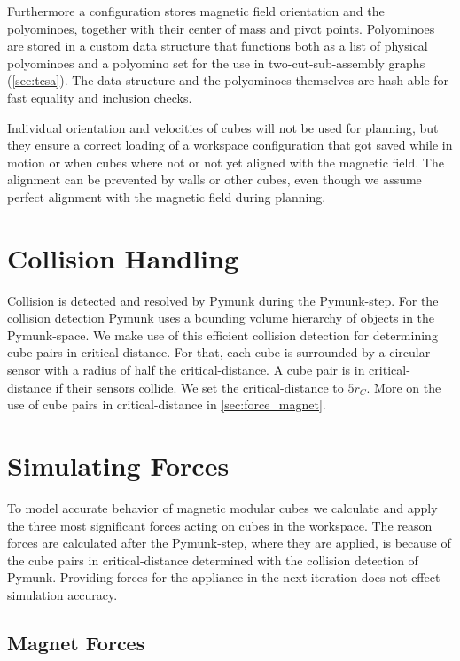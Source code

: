 Furthermore a configuration stores magnetic field orientation and the polyominoes, together with their center of mass and pivot points.
Polyominoes are stored in a custom data structure that functions both as a list of physical polyominoes and a polyomino set for the use in two-cut-sub-assembly graphs (\autoref{sec:tcsa}).
The data structure and the polyominoes themselves are hash-able for fast equality and inclusion checks.

Individual orientation and velocities of cubes will not be used for planning, but they ensure a correct loading of a workspace configuration that got saved while in motion or when cubes where not or not yet aligned with the magnetic field.
The alignment can be prevented by walls or other cubes, even though we assume perfect alignment with the magnetic field during planning.


\section{Collision Handling}
\label{sec:coll_handling}

Collision is detected and resolved by Pymunk during the Pymunk-step.
For the collision detection Pymunk uses a bounding volume hierarchy of objects in the Pymunk-space.
We make use of this efficient collision detection for determining cube pairs in critical-distance.
For that, each cube is surrounded by a circular sensor with a radius of half the critical-distance.
A cube pair is in critical-distance if their sensors collide.
We set the critical-distance to $5 r_C$.
More on the use of cube pairs in critical-distance in \autoref{sec:force_magnet}.

\section{Simulating Forces}

To model accurate behavior of magnetic modular cubes we calculate and apply the three most significant forces acting on cubes in the workspace.
The reason forces are calculated after the Pymunk-step, where they are applied, is because of the cube pairs in critical-distance determined with the collision detection of Pymunk.
Providing forces for the appliance in the next iteration does not effect simulation accuracy.

\subsection{Magnet Forces}
\label{sec:force_magnet}

